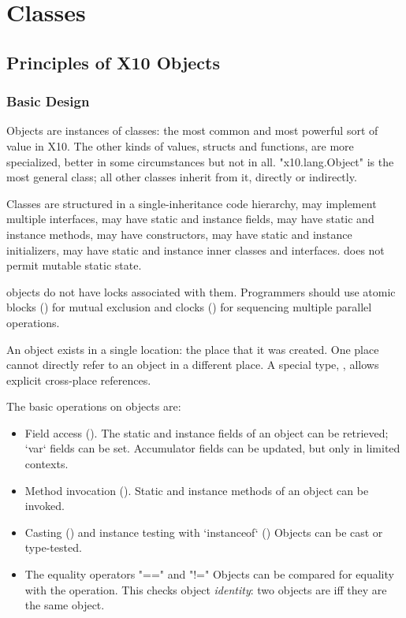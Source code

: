 \chapter{Classes}
\label{XtenClasses}
\label{ReferenceClasses}

\section{Principles of X10 Objects}\label{XtenObjects}

\subsection{Basic Design}

Objects are instances of classes: the most common and most powerful sort of
value in X10.  The other kinds of values, structs and functions, are more
specialized, better in some circumstances but not in all.
\xcd"x10.lang.Object" is the most general class; all other classes inherit
from it, directly or indirectly. 


Classes are structured in a single-inheritance code
hierarchy, may implement multiple interfaces, may have static and
instance fields, may have static and instance methods, may have
constructors, may have static and instance initializers, may have
static and instance inner classes and interfaces. \Xten{} does not
permit mutable static state.

\Xten{} objects do not have locks associated with them.
Programmers should use atomic blocks () for mutual
exclusion and clocks () for sequencing multiple parallel
operations.

An object exists in a single location: the place that it was created.  One
place cannot directly refer to an object in a different place.   A
special type, , allows explicit cross-place references. 

The basic operations on objects are:
\begin{itemize}

{}\item Field access (). 
The static and instance fields of an object can be retrieved; \xcd`var` fields
can be set.  Accumulator fields can be updated, but only in limited contexts. 

{}\item Method invocation ().  
Static and instance methods of an object can be invoked.

{}\item Casting () and instance testing with \xcd`instanceof`
() Objects can be cast or type-tested.  

\item The equality operators \xcd"==" and \xcd"!="
Objects can be compared for equality with the \Xcd{==} operation.  This checks
object {\em identity}: two objects are \Xcd{==} iff they are the same object.

\end{itemize}

